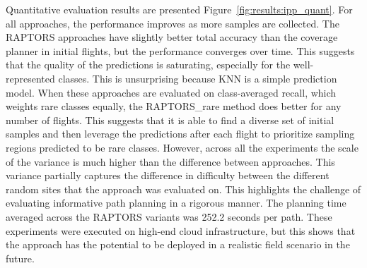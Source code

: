 Quantitative evaluation results are presented Figure~\ref{fig:results:ipp_quant}. For all approaches, the performance improves as more samples are collected. The RAPTORS approaches have slightly better total accuracy than the coverage planner in initial flights, but the performance converges over time. This suggests that the quality of the predictions is saturating, especially for the well-represented classes. This is unsurprising because KNN is a simple prediction model. When these approaches are evaluated on class-averaged recall, which weights rare classes equally, the RAPTORS\_rare method does better for any number of flights. This suggests that it is able to find a diverse set of initial samples and then leverage the predictions after each flight to prioritize sampling regions predicted to be rare classes. However, across all the experiments the scale of the variance is much higher than the difference between approaches. This variance partially captures the difference in difficulty between the different random sites that the approach was evaluated on. This highlights the challenge of evaluating informative path planning in a rigorous manner. The planning time averaged across the RAPTORS variants was 252.2 seconds per path. These experiments were executed on high-end cloud infrastructure, but this shows that the approach has the potential to be deployed in a realistic field scenario in the future.

